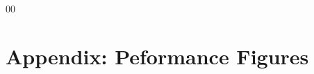 \documentclass[conference]{IEEEtran}
\begin{document}
\begin{thebibliography}{00}





\end{thebibliography}
\section{Appendix: Peformance Figures}
\end{document}
